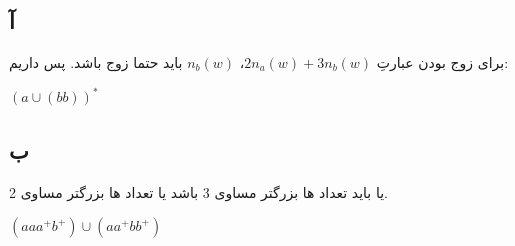 \documentclass{article}
\begin{document}
\section{}%
\subsection{آ}
برای زوج بودن عبارتِ $2n_a\left( w \right) + 3n_b\left( w \right)$، $n_b\left( w \right)$ باید حتما زوج باشد. پس داریم:
\begin{latin}
$
\left( a \cup \left( bb \right) \right) ^ *
$
\end{latin}

\subsection{ب}
یا باید تعداد ها بزرگتر مساوی 3 باشد یا تعداد ها بزرگتر مساوی 2.
\begin{latin}
$
\left( aaa ^ + b ^ + \right) \cup \left( aa ^ + bb ^ + \right)
$
\end{latin}
\end{document}
